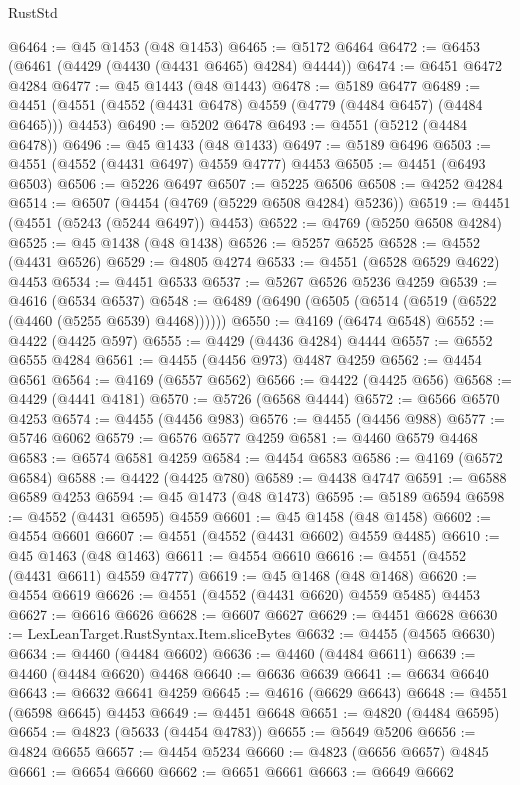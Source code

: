 \begin{lexlean}{RustStd}
\begin{coremodule}
@6464 := @45 @1453 (@48 @1453)
@6465 := @5172 @6464
@6472 := @6453 (@6461 (@4429 (@4430 (@4431 @6465) @4284) @4444))
@6474 := @6451 @6472 @4284
@6477 := @45 @1443 (@48 @1443)
@6478 := @5189 @6477
@6489 := @4451 (@4551 (@4552 (@4431 @6478) @4559 (@4779 (@4484 @6457) (@4484 @6465))) @4453)
@6490 := @5202 @6478
@6493 := @4551 (@5212 (@4484 @6478))
@6496 := @45 @1433 (@48 @1433)
@6497 := @5189 @6496
@6503 := @4551 (@4552 (@4431 @6497) @4559 @4777) @4453
@6505 := @4451 (@6493 @6503)
@6506 := @5226 @6497
@6507 := @5225 @6506
@6508 := @4252 @4284
@6514 := @6507 (@4454 (@4769 (@5229 @6508 @4284) @5236))
@6519 := @4451 (@4551 (@5243 (@5244 @6497)) @4453)
@6522 := @4769 (@5250 @6508 @4284)
@6525 := @45 @1438 (@48 @1438)
@6526 := @5257 @6525
@6528 := @4552 (@4431 @6526)
@6529 := @4805 @4274
@6533 := @4551 (@6528 @6529 @4622) @4453
@6534 := @4451 @6533
@6537 := @5267 @6526 @5236 @4259
@6539 := @4616 (@6534 @6537)
@6548 := @6489 (@6490 (@6505 (@6514 (@6519 (@6522 (@4460 (@5255 @6539) @4468))))))
@6550 := @4169 (@6474 @6548)
@6552 := @4422 (@4425 @597)
@6555 := @4429 (@4436 @4284) @4444
@6557 := @6552 @6555 @4284
@6561 := @4455 (@4456 @973) @4487 @4259
@6562 := @4454 @6561
@6564 := @4169 (@6557 @6562)
@6566 := @4422 (@4425 @656)
@6568 := @4429 (@4441 @4181)
@6570 := @5726 (@6568 @4444)
@6572 := @6566 @6570 @4253
@6574 := @4455 (@4456 @983)
@6576 := @4455 (@4456 @988)
@6577 := @5746 @6062
@6579 := @6576 @6577 @4259
@6581 := @4460 @6579 @4468
@6583 := @6574 @6581 @4259
@6584 := @4454 @6583
@6586 := @4169 (@6572 @6584)
@6588 := @4422 (@4425 @780)
@6589 := @4438 @4747
@6591 := @6588 @6589 @4253
@6594 := @45 @1473 (@48 @1473)
@6595 := @5189 @6594
@6598 := @4552 (@4431 @6595) @4559
@6601 := @45 @1458 (@48 @1458)
@6602 := @4554 @6601
@6607 := @4551 (@4552 (@4431 @6602) @4559 @4485)
@6610 := @45 @1463 (@48 @1463)
@6611 := @4554 @6610
@6616 := @4551 (@4552 (@4431 @6611) @4559 @4777)
@6619 := @45 @1468 (@48 @1468)
@6620 := @4554 @6619
@6626 := @4551 (@4552 (@4431 @6620) @4559 @5485) @4453
@6627 := @6616 @6626
@6628 := @6607 @6627
@6629 := @4451 @6628
@6630 := LexLeanTarget.RustSyntax.Item.sliceBytes
@6632 := @4455 (@4565 @6630)
@6634 := @4460 (@4484 @6602)
@6636 := @4460 (@4484 @6611)
@6639 := @4460 (@4484 @6620) @4468
@6640 := @6636 @6639
@6641 := @6634 @6640
@6643 := @6632 @6641 @4259
@6645 := @4616 (@6629 @6643)
@6648 := @4551 (@6598 @6645) @4453
@6649 := @4451 @6648
@6651 := @4820 (@4484 @6595)
@6654 := @4823 (@5633 (@4454 @4783))
@6655 := @5649 @5206
@6656 := @4824 @6655
@6657 := @4454 @5234
@6660 := @4823 (@6656 @6657) @4845
@6661 := @6654 @6660
@6662 := @6651 @6661
@6663 := @6649 @6662

\end{coremodule}
\end{lexlean}
